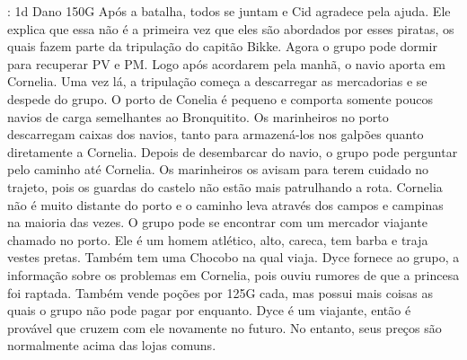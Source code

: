 {: 1d Dano \hfill {} 150G}
{}
%
\vfill
%
Após a batalha, todos se juntam e Cid agradece pela ajuda.
Ele explica que essa não é a primeira vez que eles são abordados por esses piratas, os quais fazem parte da tripulação do capitão Bikke.
Agora o grupo pode dormir para recuperar PV e PM. Logo após acordarem pela manhã, o navio aporta em Cornelia.
Uma vez lá, a tripulação começa a descarregar as mercadorias e se despede do grupo.
O porto de Conelia é pequeno e comporta somente poucos navios de carga semelhantes ao Bronquitito.
Os marinheiros no porto descarregam caixas dos navios, tanto para armazená-los nos galpões quanto diretamente a Cornelia.
%
\vfill
%
%
\clearpage
%
Depois de desembarcar do navio, o grupo pode perguntar pelo caminho até Cornelia.
Os marinheiros os avisam para terem cuidado no trajeto, pois os guardas do castelo não estão mais patrulhando a rota.
Cornelia não é muito distante do porto e o caminho leva através dos campos e campinas na maioria das vezes.
O grupo pode se encontrar com um mercador viajante chamado  no porto.
Ele é um homem atlético, alto, careca, tem barba e traja vestes pretas.
Também tem uma Chocobo na qual viaja.
Dyce fornece ao grupo, a informação sobre os problemas em Cornelia, pois ouviu rumores de que a princesa foi raptada.
Também vende poções por 125G cada, mas possui mais coisas as quais o grupo não pode pagar por enquanto.
Dyce é um viajante, então é provável que cruzem com ele novamente no futuro.
No entanto, seus preços são normalmente acima das lojas comuns.
%
\ofpar
%
